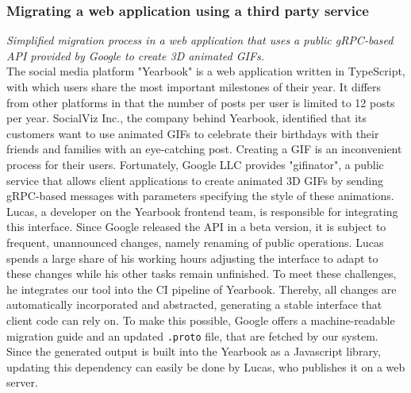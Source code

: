 \subsubsection{Migrating a web application using a third party service}
\label{subsubsec:Scenario:gRPCScenario}

\textit{Simplified migration process in a web application that uses a public gRPC-based API provided by Google to create 3D animated GIFs.}
\medskip
\\ The social media platform "Yearbook" is a web application written in TypeScript, with which users share the most important milestones of their year. It differs from other platforms in that the number of posts per user is limited to 12 posts per year. SocialViz Inc., the company behind Yearbook, identified that its customers want to use animated GIFs to celebrate their birthdays with their friends and families with an eye-catching post. Creating a GIF is an inconvenient process for their users. Fortunately, Google LLC provides "gifinator", a public service that allows client applications to create animated 3D GIFs by sending gRPC-based messages with parameters specifying the style of these animations. Lucas, a developer on the Yearbook frontend team, is responsible for integrating this interface. Since Google released the API in a beta version, it is subject to frequent, unannounced changes, namely renaming of public operations. Lucas spends a large share of his working hours adjusting the interface to adapt to these changes while his other tasks remain unfinished. To meet these challenges, he integrates our tool into the CI pipeline of Yearbook. Thereby, all changes are automatically incorporated and abstracted, generating a stable interface that client code can rely on. To make this possible, Google offers a machine-readable migration guide and an updated \texttt{.proto} file, that are fetched by our system. Since the generated output is built into the Yearbook as a Javascript library, updating this dependency can easily be done by Lucas, who publishes it on a web server.